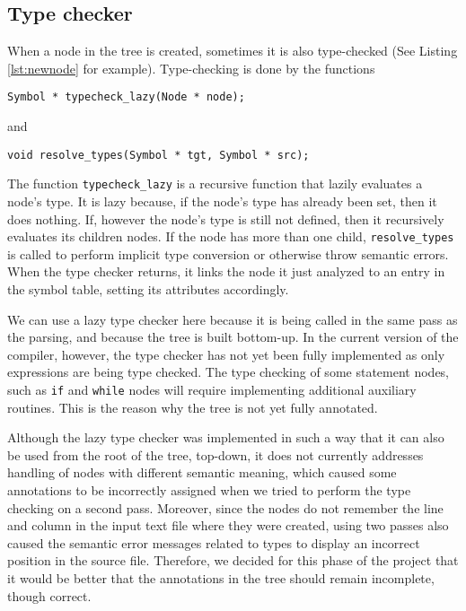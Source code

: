 
\subsection{Type checker}
\label{section:tc}

When a node in the tree is created, sometimes it is also type-checked
(See Listing \ref{lst:newnode} for example). Type-checking is done by the functions

\begin{lstlisting}
Symbol * typecheck_lazy(Node * node);
\end{lstlisting}
and
\begin{lstlisting}
void resolve_types(Symbol * tgt, Symbol * src);
\end{lstlisting}


The function \texttt{typecheck\_lazy} is a recursive function that lazily evaluates a node's
type. It is lazy because, if the node's type has already been set, then it does nothing.
If, however the node's type is still not defined, then it recursively evaluates its children
nodes. If the node has more than one child, \texttt{resolve\_types} is called to perform implicit
type conversion or otherwise throw semantic errors. When the type checker returns, it links
the node it just analyzed to an entry in the symbol table, setting its attributes accordingly.

We can use a lazy type checker here because it is being called in the same pass as the parsing, 
and because the tree is built bottom-up. In the current version of the compiler, however,
the type checker has not yet been fully implemented as only expressions are being type checked.
The type checking of some statement nodes, such as \texttt{if} and \texttt{while} nodes will
require implementing additional auxiliary routines. This is the reason why the tree is not yet
fully annotated.

Although the lazy type checker was implemented in such a way that it can also be used from the
root of the tree, top-down, it does not currently addresses handling of nodes with different
semantic meaning, which caused some annotations to be incorrectly assigned when we tried to
perform the type checking on a second pass. Moreover, since the nodes do not remember the
line and column in the input text file where they were created, using two passes also caused
the semantic error messages related to types to display an incorrect position in the source
file. Therefore, we decided for this phase of the project that it would be better that the
annotations in the tree should remain incomplete, though correct.

